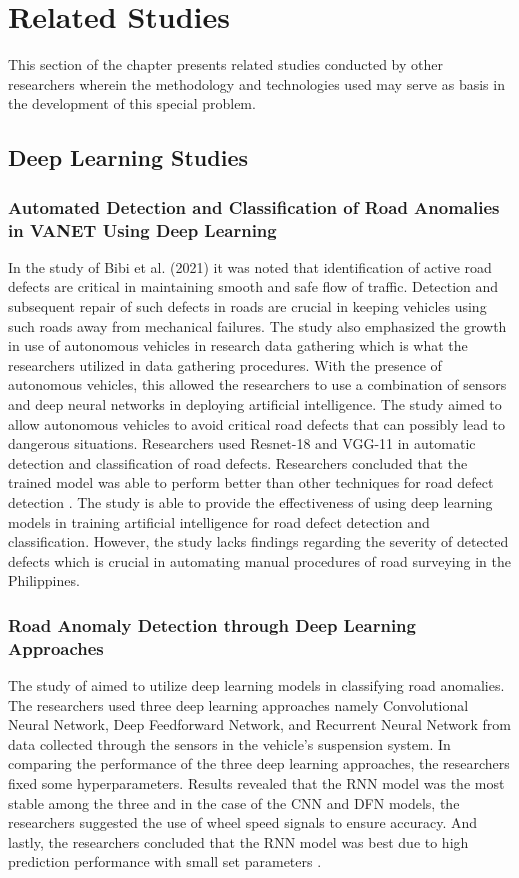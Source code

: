 \section{Related Studies}
This section of the chapter presents related studies conducted by other researchers wherein the methodology and technologies used may serve as basis in the development of this special problem.

\subsection{Deep Learning Studies}

\subsubsection{Automated Detection and Classification of Road Anomalies in VANET Using Deep Learning}
In the study of Bibi et al. (2021) it was noted that identification of active road defects are critical in maintaining smooth and safe flow of traffic. Detection and subsequent repair of such defects in roads are crucial in keeping vehicles using such roads away from mechanical failures. The study also emphasized the growth in use of autonomous vehicles in research data gathering which is what the researchers utilized in data gathering procedures. With the presence of autonomous vehicles, this allowed the researchers to use a combination of sensors and deep neural networks in deploying artificial intelligence. The study aimed to allow autonomous vehicles to avoid critical road defects that can possibly lead to dangerous situations. Researchers used Resnet-18 and VGG-11 in automatic detection and classification of road defects. Researchers concluded that the trained model was able to perform better than other techniques for road defect detection \cite{bibi2021}. The study is able to provide the effectiveness of using deep learning models in training artificial intelligence for road defect detection and classification. However, the study lacks findings regarding the severity of detected defects which is crucial in automating manual procedures of road surveying in the Philippines.

\subsubsection{Road Anomaly Detection through Deep Learning Approaches}
The study of  aimed to utilize deep learning models in classifying road anomalies. The researchers used three deep learning approaches namely Convolutional Neural Network, Deep Feedforward Network, and Recurrent Neural Network from data collected through the sensors in the vehicle's suspension system. In comparing the performance of the three deep learning approaches, the researchers fixed some hyperparameters. Results revealed that the RNN model was the most stable among the three and in the case of the CNN and DFN models, the researchers suggested the use of wheel speed signals to ensure accuracy. And lastly, the researchers concluded that the RNN model was best due to high prediction performance with small set parameters \cite{luo2020}.

